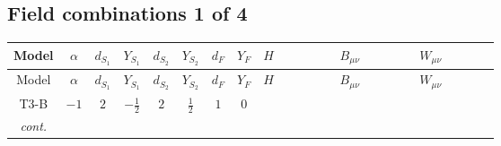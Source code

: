 \documentclass[8pt]{article}
\begin{document}
\begin{landscape}
\subsection*{Field combinations 1 of 4}
\begin{longtable}{@{}cccccccc >{\raggedright\arraybackslash}p{0.21\linewidth} >{\raggedright\arraybackslash}p{0.21\linewidth} >{\raggedright\arraybackslash}p{0.21\linewidth}@{}}
\toprule
Model & $\alpha$ & $d_{S_1}$ & $Y_{S_1}$ & $d_{S_2}$ & $Y_{S_2}$ & $d_F$ & $Y_F$ & $H$ & $B_{\mu\nu}$ & $W_{\mu\nu}$ \\
\midrule
\endfirsthead
\toprule
Model & $\alpha$ & $d_{S_1}$ & $Y_{S_1}$ & $d_{S_2}$ & $Y_{S_2}$ & $d_F$ & $Y_F$ & $H$ & $B_{\mu\nu}$ & $W_{\mu\nu}$ \\
\midrule
\endhead
T3-B & $-1$ & $2$ & $-\frac{1}{2}$ & $2$ & $\frac{1}{2}$ & $1$ & $0$ & \scriptsize\adjustbox{max width=\linewidth}{$\begin{gathered} +C_{\text{H2}} H_{a_1} H_{a_1}{}^{\dagger } \\ -H_{a_1} \mu ^2 H_{a_1}{}^{\dagger } \\ +\frac{4 \hbar  \overline{\lambda_5} H_{a_1} H_{a_2} \lambda_5 H_{a_1}{}^{\dagger } H_{a_2}{}^{\dagger }}{3 \epsilon }\end{gathered}$} & \scriptsize\adjustbox{max width=\linewidth}{$\begin{gathered} -\frac{\hbar  B_{\mu _1\mu _2}^2}{12 \epsilon } \\ -\frac{1}{24} \hbar  \log \left(\frac{\bar{\mu}^{2}}{m_1^2}\right) B_{\mu _1\mu _2}^2 \\ -\frac{1}{24} \hbar  \log \left(\frac{\bar{\mu}^{2}}{m_2^2}\right) B_{\mu _1\mu _2}^2\end{gathered}$} & \scriptsize\adjustbox{max width=\linewidth}{$\begin{gathered} -\frac{\hbar  \left(W_{\mu _1\mu _2}^{A_1}\right){}^2}{12 \epsilon } \\ -\frac{1}{24} \hbar  \log \left(\frac{\bar{\mu}^{2}}{m_1^2}\right) \left(W_{\mu _1\mu _2}^{A_1}\right){}^2 \\ -\frac{1}{24} \hbar  \log \left(\frac{\bar{\mu}^{2}}{m_2^2}\right) \left(W_{\mu _1\mu _2}^{A_1}\right){}^2\end{gathered}$} \\
\textit{cont.} &  &  &  &  &  &  &  & \scriptsize\adjustbox{max width=\linewidth}{$\begin{gathered} +\frac{4 \hbar  \overline{\lambda_5} H_{a_1} H_{a_2} m_1^2 \lambda_5 H_{a_1}{}^{\dagger } H_{a_2}{}^{\dagger }}{3 \left(m_1^2-m_2^2\right)} \\ +\frac{4 \hbar  \log \left(\frac{\bar{\mu}^{2}}{m_1^2}\right) \overline{\lambda_5} H_{a_1} H_{a_2} m_1^2 \lambda_5 H_{a_1}{}^{\dagger } H_{a_2}{}^{\dagger }}{3 \left(m_1^2-m_2^2\right)} \\ -\frac{4 \hbar  \overline{\lambda_5} H_{a_1} H_{a_2} m_2^2 \lambda_5 H_{a_1}{}^{\dagger } H_{a_2}{}^{\dagger }}{3 \left(m_1^2-m_2^2\right)}\end{gathered}$} &  &  \\

\end{longtable}
\end{landscape}
\end{document}
